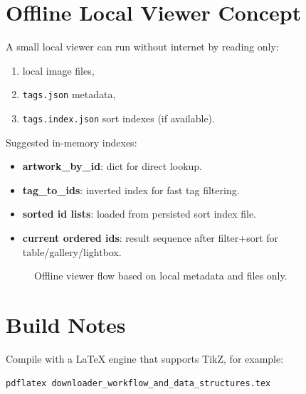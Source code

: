 \documentclass[11pt]{article}
\begin{document}
\section{Offline Local Viewer Concept}
A small local viewer can run without internet by reading only:
\begin{enumerate}
    \item local image files,
    \item \texttt{tags.json} metadata,
    \item \texttt{tags.index.json} sort indexes (if available).
\end{enumerate}

Suggested in-memory indexes:
\begin{itemize}
    \item \textbf{artwork\_by\_id}: dict for direct lookup.
    \item \textbf{tag\_to\_ids}: inverted index for fast tag filtering.
    \item \textbf{sorted id lists}: loaded from persisted sort index file.
    \item \textbf{current ordered ids}: result sequence after filter+sort for table/gallery/lightbox.
\end{itemize}

\begin{figure}[htbp]
\centering
{}
\caption{Offline viewer flow based on local metadata and files only.}
\end{figure}

\section{Build Notes}
Compile with a LaTeX engine that supports TikZ, for example:
\begin{verbatim}
pdflatex downloader_workflow_and_data_structures.tex
\end{verbatim}
\end{document}
